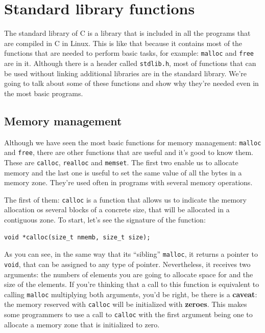 \documentclass[a4paper]{article}
\begin{document}
\section{Standard library functions}
The standard library of C is a library that is included in all the programs that
are compiled in C in Linux. This is like that because it contains most of the
functions that are needed to perform basic tasks, for example: \verb!malloc! and
\verb!free! are in it. Although there is a header called \verb!stdlib.h!, most
of functions that can be used without linking additional libraries are in the
standard library. We're going to talk about some of these functions and
show why they're needed even in the most basic programs.

\subsection{Memory management}
Although we have seen the most basic functions for memory management:
\verb!malloc! and \verb!free!, there are other functions that are useful and
it's good to know them. These are \verb!calloc!, \verb!realloc! and
\verb!memset!. The first two enable us to allocate memory and the last one
is useful to set the same value of all the bytes in a memory zone. They're used
often in programs with several memory operations.

The first of them: \verb!calloc! is a function that allows us to indicate the
memory allocation os several blocks of a concrete size, that will be allocated
in a contiguous zone. To start, let's see the signature of the function:

\noindent
\begin{minipage}[H]{\linewidth}
\mbox{}
\begin{lstlisting}[style=C,
caption={Signature of function \texttt{calloc}},
label={lst:callocSignature}]
void *calloc(size_t nmemb, size_t size);
\end{lstlisting}
\end{minipage}

As you can see, in the same way that its ``sibling'' \verb!malloc!, it returns
a pointer to \verb"void", that can be assigned to any type of pointer.
Nevertheless, it receives two arguments: the numbers of elements you are going
to allocate space for and the size of the elements. If you're thinking that a
call to this function is equivalent to calling \verb!malloc! multiplying both
arguments, you'd be right, be there is a \textbf{caveat}: the memory reserved
with \verb!calloc! will be initialized with \textbf{zeroes}. This makes some
programmers to use a call to \verb"calloc" with the first argument being one to
allocate a memory zone that is initialized to zero.
\end{document}
